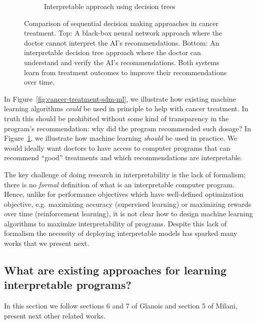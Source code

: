 \begin{figure}[htbp]
\begin{subfigure}[b]{0.7\textwidth}
\begin{tikzpicture}
        \end{tikzpicture}
        \caption{Interpretable approach using decision trees}
        \label{fig:cancer-treatment-comparison}
    \end{subfigure}
    \caption{Comparison of sequential decision making approaches in cancer treatment. Top: A black-box neural network approach where the doctor cannot interpret the AI's recommendations. Bottom: An interpretable decision tree approach where the doctor can understand and verify the AI's recommendations. Both systems learn from treatment outcomes to improve their recommendations over time.}
    \label{fig:cancer-treatment-comparison-combined}
\end{figure}

In Figure~\ref{fig:cancer-treatment-sdm-ml}, we illustrate how existing machine learning algorithms \textit{could} be used in principle to help with cancer treatment. In truth this should be prohibited without some kind of transparency in the program's recommendation: why did the program recommended such dosage?
In Figure~\ref{fig:cancer-treatment-comparison}, we illustrate how machine learning \textit{should} be used in practice. We would ideally want doctors to have access to computer programs that can recommend ``good'' treatments and which recommendations are interpretable. 

The key challenge of doing research in interpretability is the lack of formalism; there is no \textit{formal} definition of what is an interpretable computer program. Hence, unlike for performance objectives which have well-defined optimization objective, e.g. maximizing accuracy (supervised learning) or maximizing rewards over time (reinforcement learning), it is not clear how to design machine learning algorithms to maximize interpretability of programs. 
Despite this lack of formalism the necessity of deploying interpretable models has sparked many works that we present next.
\subsection{What are existing approaches for learning interpretable programs?}

In this section we follow sections 6 and 7 of Glanois and section 5 of Milani, present next other related works.


